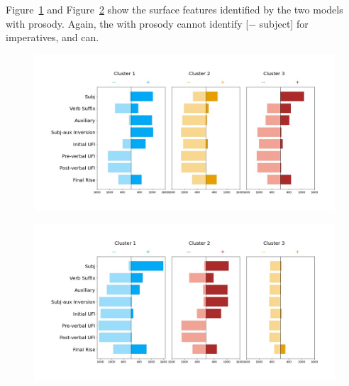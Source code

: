 Figure~\ref{fig:baseline-syncluster-prosody} and Figure~\ref{fig:target-syncluster-prosody} show the surface features identified by the two models with prosody. Again, the \dlearnerabbr{} with prosody cannot identify [$-$ subject] for imperatives, and \plearnerabbr{} can.  



\begin{figure}[H]
    \centering
    \includegraphics[width=1\textwidth]{figures/baseline-syncluster-bu.jpg}
    \caption{}
    \label{fig:baseline-syncluster-prosody}
\end{figure}

\begin{figure}[H]
    \centering
    \includegraphics[width=1\textwidth]{figures/target-syncluster-bu.jpg}
    \caption{}
    \label{fig:target-syncluster-prosody}
\end{figure}

